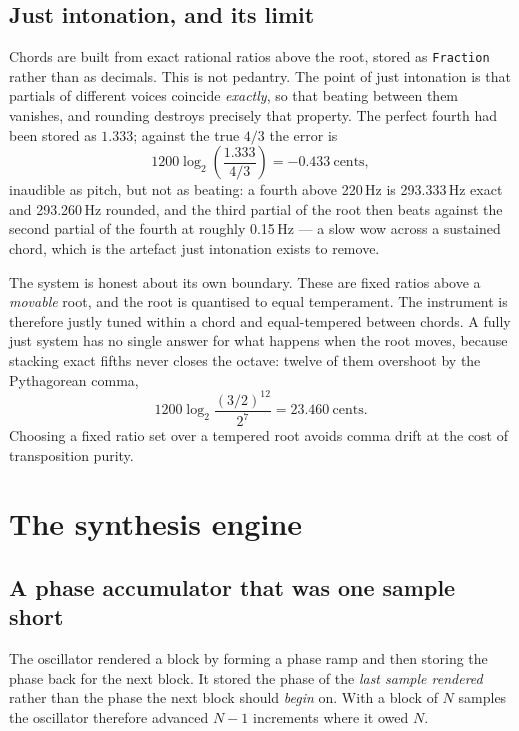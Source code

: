 \documentclass[a4paper,10pt,twocolumn]{article}
\newcommand{\code}[1]{\texttt{\small #1}}
\begin{document}
\subsection{Just intonation, and its limit}
\label{sec:tuning}

Chords are built from exact rational ratios above the root, stored as
\code{Fraction} rather than as decimals. This is not pedantry. The point of
just intonation is that partials of different voices coincide \emph{exactly},
so that beating between them vanishes, and rounding destroys precisely that
property. The perfect fourth had been stored as $1.333$; against the true
$4/3$ the error is
\begin{equation}
1200\log_2\!\left(\frac{1.333}{4/3}\right) = -0.433\ \text{cents},
\end{equation}
inaudible as pitch, but not as beating: a fourth above 220\,Hz is 293.333\,Hz
exact and 293.260\,Hz rounded, and the third partial of the root then beats
against the second partial of the fourth at roughly 0.15\,Hz --- a slow wow
across a sustained chord, which is the artefact just intonation exists to
remove.

The system is honest about its own boundary. These are fixed ratios above a
\emph{movable} root, and the root is quantised to equal temperament. The
instrument is therefore justly tuned within a chord and equal-tempered between
chords. A fully just system has no single answer for what happens when the root
moves, because stacking exact fifths never closes the octave: twelve of them
overshoot by the Pythagorean comma,
\begin{equation}
1200\log_2\frac{(3/2)^{12}}{2^{7}} = 23.460\ \text{cents}.
\end{equation}
Choosing a fixed ratio set over a tempered root avoids comma drift at the cost
of transposition purity.

\section{The synthesis engine}

\subsection{A phase accumulator that was one sample short}
\label{sec:phase}

The oscillator rendered a block by forming a phase ramp and then storing the
phase back for the next block. It stored the phase of the \emph{last sample
rendered} rather than the phase the next block should \emph{begin} on. With a
block of $N$ samples the oscillator therefore advanced $N-1$ increments where
it owed $N$.
\end{document}
